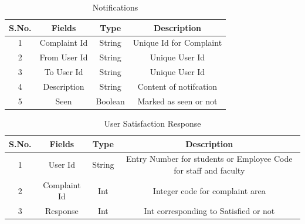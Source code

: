 \documentclass{article}
\begin{document}
\begin{table}[!htb]
\centering
\caption{Notifications}
\label{my-label}
\begin{tabular}{|c|c|c|c|}
\hline
\textbf{S.No.} & \textbf{Fields} & \textbf{Type} & \textbf{Description}    \\ \hline
1              & Complaint Id    & String        & Unique Id for Complaint \\ \hline
2              & From User Id    & String        & Unique User Id          \\ \hline
3              & To User Id      & String        & Unique User Id          \\ \hline
4              & Description     & String        & Content of notifcation  \\ \hline
5              & Seen            & Boolean       & Marked as seen or not   \\ \hline
\end{tabular}
\end{table}


\begin{table}[!htb]
\centering
\caption{User Satisfaction Response}
\label{my-label}
\begin{tabular}{|c|c|c|c|}
\hline
\textbf{S.No.} & \textbf{Fields} & \textbf{Type} & \textbf{Description}                                             \\ \hline
1              & User Id         & String        & Entry Number for students or Employee Code for staff and faculty \\ \hline
2              & Complaint Id    & Int           & Integer code for complaint area                                  \\ \hline
3              & Response         & Int           & Int corresponding to Satisfied or not 				           \\ \hline
\end{tabular}
\end{table}
\end{document}
